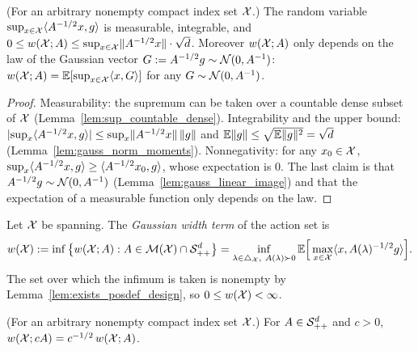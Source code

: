 \begin{lemma}\label{lem:width_matrix_wd}
\leanok
{}
(For an arbitrary nonempty compact index set $\mathcal{X}$.) The random variable $\sup_{x\in\mathcal{X}}\langle A^{-1/2}x, g \rangle$ is measurable, integrable, and
$0 \le w(\mathcal{X};A) \le \sup_{x\in\mathcal{X}}\lVert A^{-1/2}x \rVert\cdot \sqrt d$.
Moreover $w(\mathcal{X};A)$ only depends on the law of the Gaussian vector
$G := A^{-1/2}g \sim \mathcal{N}(0, A^{-1})$: $w(\mathcal{X};A) = \mathbb{E}[\sup_{x\in\mathcal{X}}\langle x, G \rangle]$ for
any $G \sim \mathcal{N}(0,A^{-1})$.
\end{lemma}

\begin{proof}
\leanok
{}
Measurability: the supremum can be taken over a countable dense subset of $\mathcal{X}$
(Lemma~\ref{lem:sup_countable_dense}). Integrability and the upper bound:
$\lvert \sup_x \langle A^{-1/2}x, g \rangle \rvert \le \sup_x\lVert A^{-1/2}x \rVert\,\lVert g \rVert$ and
$\mathbb{E}\lVert g \rVert \le \sqrt{\mathbb{E}\lVert g \rVert^2} = \sqrt d$ (Lemma~\ref{lem:gauss_norm_moments}).
Nonnegativity: for any $x_0\in\mathcal{X}$, $\sup_x \langle A^{-1/2}x, g \rangle \ge \langle A^{-1/2}x_0, g \rangle$, whose
expectation is $0$. The last claim is that $A^{-1/2}g \sim \mathcal{N}(0,A^{-1})$
(Lemma~\ref{lem:gauss_linear_image}) and that the expectation of a measurable function only
depends on the law.
\end{proof}

\begin{definition}\label{def:width}
\leanok
{}
Let $\mathcal{X}$ be spanning. The \emph{Gaussian width term} of the action set is
\[
  w(\mathcal{X}) := \inf\big\{ w(\mathcal{X};A) : A \in \mathcal{M}(\mathcal{X}) \cap \mathcal{S}_{++}^{d} \big\}
  = \inf_{\lambda \in \triangle_{\mathcal{X}},\ A(\lambda)\succ 0}
    \mathbb{E}\Big[\max_{x\in\mathcal{X}}\langle x, A(\lambda)^{-1/2}g \rangle\Big].
\]
The set over which the infimum is taken is nonempty by Lemma~\ref{lem:exists_posdef_design},
so $0 \le w(\mathcal{X}) < \infty$.
\end{definition}

\begin{lemma}[Homogeneity]\label{lem:width_homog}
\leanok
{}
(For an arbitrary nonempty compact index set $\mathcal{X}$.) For $A \in \mathcal{S}_{++}^{d}$ and $c > 0$,
$w(\mathcal{X};cA) = c^{-1/2}\,w(\mathcal{X};A)$.
\end{lemma}


